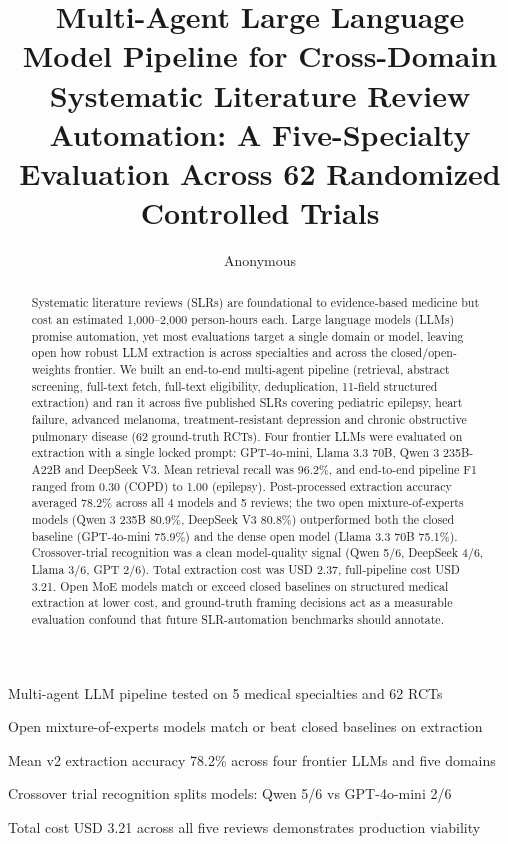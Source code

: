 \documentclass[a4paper,fleqn]{cas-sc}
\begin{document}
\let\WriteBookmarks\relax
\def\floatpagepagefraction{1}
\def\textpagefraction{.001}


\title[mode = title]{Multi-Agent Large Language Model Pipeline for
Cross-Domain Systematic Literature Review Automation: A Five-Specialty
Evaluation Across 62 Randomized Controlled Trials}

\author[1]{Anonymous}
\cormark[1]

\begin{abstract}
Systematic literature reviews (SLRs) are foundational to evidence-based
medicine but cost an estimated 1{,}000--2{,}000 person-hours each.
Large language models (LLMs) promise automation, yet most evaluations
target a single domain or model, leaving open how robust LLM extraction is
across specialties and across the closed/open-weights frontier. We built
an end-to-end multi-agent pipeline (retrieval, abstract screening,
full-text fetch, full-text eligibility, deduplication, 11-field structured
extraction) and ran it across five published SLRs covering pediatric
epilepsy, heart failure, advanced melanoma, treatment-resistant depression
and chronic obstructive pulmonary disease (62 ground-truth RCTs).
Four frontier LLMs were evaluated on extraction with a single locked
prompt: GPT-4o-mini, Llama 3.3 70B, Qwen 3 235B-A22B and DeepSeek V3.
Mean retrieval recall was 96.2\%, and end-to-end pipeline F1 ranged
from 0.30 (COPD) to 1.00 (epilepsy). Post-processed extraction accuracy
averaged 78.2\% across all 4 models and 5 reviews; the two open
mixture-of-experts models (Qwen 3 235B 80.9\%, DeepSeek V3 80.8\%)
outperformed both the closed baseline (GPT-4o-mini 75.9\%) and the dense
open model (Llama 3.3 70B 75.1\%). Crossover-trial recognition was a
clean model-quality signal (Qwen 5/6, DeepSeek 4/6, Llama 3/6, GPT 2/6).
Total extraction cost was USD 2.37, full-pipeline cost USD 3.21. Open
MoE models match or exceed closed baselines on structured medical
extraction at lower cost, and ground-truth framing decisions act as a
measurable evaluation confound that future SLR-automation benchmarks
should annotate.
\end{abstract}

\begin{highlights}
\item Multi-agent LLM pipeline tested on 5 medical specialties and 62 RCTs
\item Open mixture-of-experts models match or beat closed baselines on extraction
\item Mean v2 extraction accuracy 78.2\% across four frontier LLMs and five domains
\item Crossover trial recognition splits models: Qwen 5/6 vs GPT-4o-mini 2/6
\item Total cost USD 3.21 across all five reviews demonstrates production viability
\end{highlights}
\end{document}
